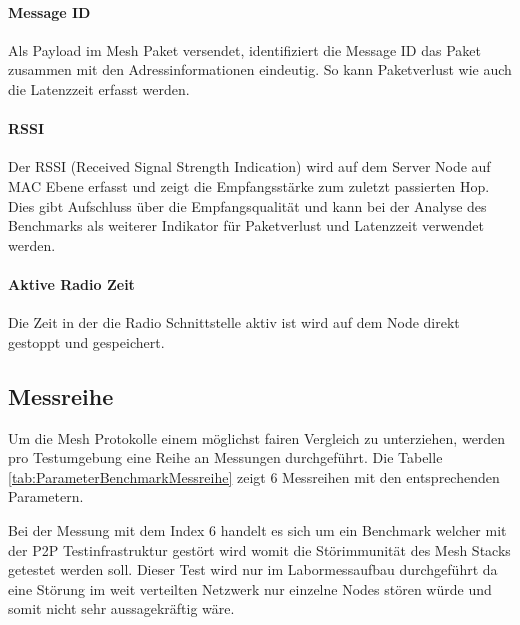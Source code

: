 \paragraph{Message ID}
Als Payload im Mesh Paket versendet, identifiziert die Message ID das Paket zusammen mit den Adressinformationen eindeutig. So kann Paketverlust wie auch die Latenzzeit erfasst werden.

\paragraph{RSSI}
Der RSSI (Received Signal Strength Indication) wird auf dem Server Node auf MAC Ebene erfasst und zeigt die Empfangsstärke zum zuletzt passierten Hop. Dies gibt Aufschluss über die Empfangsqualität und kann bei der Analyse des Benchmarks als weiterer Indikator für Paketverlust und Latenzzeit verwendet werden.

\paragraph{Aktive Radio Zeit}
Die Zeit in der die Radio Schnittstelle aktiv ist wird auf dem Node direkt gestoppt und gespeichert.


\subsection{Messreihe}\label{subsec:Messreihe}
Um die Mesh Protokolle einem möglichst fairen Vergleich zu unterziehen, werden pro Testumgebung eine Reihe an Messungen durchgeführt. Die Tabelle \ref{tab:ParameterBenchmarkMessreihe} zeigt 6 Messreihen mit den entsprechenden Parametern.

Bei der Messung mit dem Index 6 handelt es sich um ein Benchmark welcher mit der P2P Testinfrastruktur gestört wird womit die Störimmunität des Mesh Stacks getestet werden soll. Dieser Test wird nur im Labormessaufbau durchgeführt da eine Störung im weit verteilten Netzwerk nur einzelne Nodes stören würde und somit nicht sehr aussagekräftig wäre.


